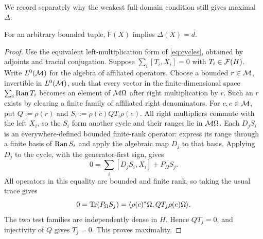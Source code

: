 We record separately why the weakest full-domain condition still gives maximal $\Delta$.
\begin{proposition}\label{prop:bare-maximal}
For an arbitrary bounded tuple, $\mathsf F(X)$ implies $\Delta(X)=d$.
\end{proposition}
\begin{proof}
Use the equivalent left-multiplication form of \eqref{eq:cycles}, obtained by adjoints and tracial conjugation.
Suppose $\sum_i[T_i,X_i]=0$ with $T_i\in\mathcal F(H)$.
Write $L^0(\mathcal M)$ for the algebra of affiliated operators.
Choose a bounded $r\in\mathcal M$, invertible in $L^0(\mathcal M)$, such that every vector in the finite-dimensional space $\sum_i\operatorname{Ran} T_i$ becomes an element of $\mathcal M\Omega$ after right multiplication by $r$.
Such an $r$ exists by clearing a finite family of affiliated right denominators.
For $c,e\in\mathcal M$, put $Q:=\rho(r)$ and $S_i:=\rho(c)QT_i\rho(e)$.
All right multipliers commute with the left $X_i$, so the $S_i$ form another cycle and their ranges lie in $\mathcal M\Omega$.
Each $D_jS_i$ is an everywhere-defined bounded finite-rank operator: express its range through a finite basis of $\operatorname{Ran} S_i$ and apply the algebraic map $D_j$ to that basis.
Applying $D_j$ to the cycle, with the generator-first sign, gives
\[
 0=\sum_i[D_jS_i,X_i]+P_\Omega S_j.
\]
All operators in this equality are bounded and finite rank, so taking the usual trace gives
\[
 0=\operatorname{Tr}(P_\Omega S_j)
 =\langle\rho(c)^*\Omega,QT_j\rho(e)\Omega\rangle.
\]
The two test families are independently dense in $H$.
Hence $QT_j=0$, and injectivity of $Q$ gives $T_j=0$.
This proves maximality.
\end{proof}
